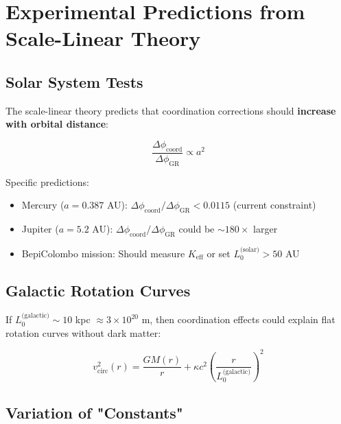 \documentclass[11pt,a4paper]{article}
\begin{document}

\section{Experimental Predictions from Scale-Linear Theory}
\label{sec:scale-predictions}

\subsection{Solar System Tests}

The scale-linear theory predicts that coordination corrections should 
\textbf{increase with orbital distance}:

\begin{equation}
	\frac{\Delta\phi_{\text{coord}}}{\Delta\phi_{\text{GR}}} \propto a^2
\end{equation}

Specific predictions:
\begin{itemize}
	\item Mercury ($a = 0.387$ AU): $\Delta\phi_{\text{coord}}/\Delta\phi_{\text{GR}} < 0.0115$ (current constraint)
	\item Jupiter ($a = 5.2$ AU): $\Delta\phi_{\text{coord}}/\Delta\phi_{\text{GR}}$ could be $\sim 180\times$ larger
	\item BepiColombo mission: Should measure $K_{\mathrm{eff}}$ or set $L_0^{\text{(solar)}} > 50$ AU
\end{itemize}

\subsection{Galactic Rotation Curves}

If $L_0^{\text{(galactic)}} \sim 10$ kpc $\approx 3\times10^{20}$ m, then 
coordination effects could explain flat rotation curves without dark matter:

\begin{equation}
	v_{\text{circ}}^2(r) = \frac{GM(r)}{r} + \kappa c^2 \left(\frac{r}{L_0^{\text{(galactic)}}}\right)^2
\end{equation}

\subsection{Variation of "Constants"}
\end{document}
